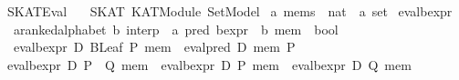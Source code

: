 %
\begin{isabellebody}%
\def\isabellecontext{SKAT{\isaliteral{5F}{\isacharunderscore}}Eval}%
%
\isadelimtheory
%
\endisadelimtheory
%
\isatagtheory
{}\isamarkupfalse%
\ SKAT{}Eval\isanewline
\ \ \ SKAT\ KAT{}Module\ Set{}Model\isanewline
{}%
\endisatagtheory
{\isafoldtheory}%
%
\isadelimtheory
\isanewline
%
\endisadelimtheory
\isanewline
{}\isamarkupfalse%
\ {}a\ mems\ {}\ {}{}nat\ {}\ {}a{}\ set{}\isanewline
\isanewline
{}\isamarkupfalse%
\ eval{}bexpr\ {}{}\isanewline
\ \ {}{}{}a{}{}ranked{}alphabet{}\ {}b{}\ interp\ {}\ {}a\ pred\ bexpr\ {}\ {}b\ mem\ {}\ bool{}\isanewline
\ \ \isanewline
\ \ {}eval{}bexpr\ D\ {}BLeaf\ P{}\ mem\ {}\ eval{}pred\ D\ mem\ P{}\isanewline
{}\ {}eval{}bexpr\ D\ {}P\ {}{}{}\ Q{}\ mem\ {}\ {}eval{}bexpr\ D\ P\ mem\ {}\ eval{}bexpr\ D\ Q\ mem{}{}\isanewline

\end{isabellebody}
